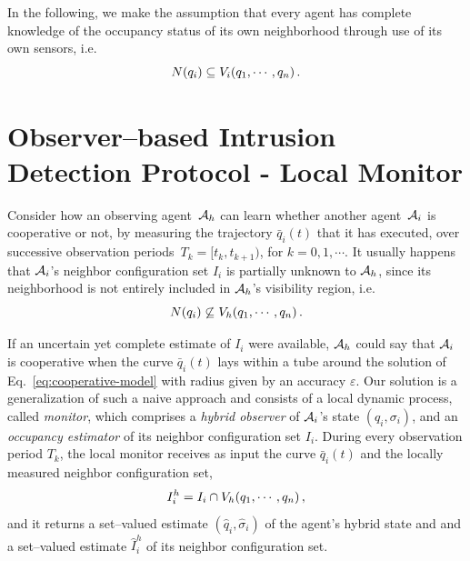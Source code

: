 \documentclass[journal, onecolumn, 12pt]{styles/IEEEtran}
\begin{document}
In the following, we make the assumption that every agent has complete knowledge of the occupancy status of its own neighborhood through use of its own sensors, i.e.  
$$
N(q_i) \subseteq V_i(q_1, \cdots, q_n) \, . 
$$ 


%
%
%

\newpage 

\section{Observer--based Intrusion Detection Protocol - Local Monitor}
\label{sec:monitor}

Consider how an observing agent~$\mathcal{A}_h$ can learn whether another agent~$\mathcal{A}_i$ is cooperative or not, by measuring the trajectory $\bar{q}_i(t)$ that it has executed, over successive observation periods~$T_k=[t_k, t_{k+1})$, for $k=0, 1, \cdots$. It usually happens that $\mathcal{A}_i$'s neighbor configuration set $I_i$ is partially unknown to $\mathcal{A}_h$, since its neighborhood is not entirely included in $\mathcal{A}_h$'s visibility region, i.e. 
$$
N(q_i) \not\subseteq V_h(q_1, \cdots, q_n) \, .
$$ 


If an uncertain yet complete estimate of $I_i$ were available, $\mathcal{A}_h$ could say that $\mathcal{A}_i$ is cooperative when the curve $\bar{q}_i(t)$ lays within a tube around the solution of Eq.~\ref{eq:cooperative-model} with radius given by an accuracy $\varepsilon$. Our solution is a generalization of such a naive approach and consists of a local dynamic process, called {\em monitor}, which comprises a {\em hybrid observer} of $\mathcal{A}_i$'s state $(q_i, \sigma_i)$, and an {\em occupancy estimator} of its neighbor configuration set $I_i$. During every observation period $T_k$, the local monitor receives as input the curve $\bar{q}_i(t)$ and the locally measured neighbor configuration set, 
$$
I_i^h=I_i \cap V_h(q_1, \cdots, q_n) \, ,
$$
and it returns a set--valued estimate $(\hat{q}_i, \hat\sigma_i)$ of the agent's hybrid state and and a set--valued estimate $\hat{I}_i^h$ of its neighbor configuration set.
\end{document}
